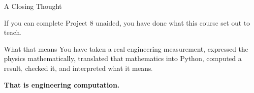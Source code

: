 \documentclass[9pt,aspectratio=169,xcolor=table]{beamer}
\begin{document}
\begin{frame}{A Closing Thought}
    \leavevmode
    \begin{center}
    \large
    If you can complete Project 8 unaided, you have done what this
    course set out to teach.
    \end{center}

    \vspace{4mm}
    \begin{block}{What that means}
        You have taken a real engineering measurement, expressed the
        physics mathematically, translated that mathematics into Python,
        computed a result, checked it, and interpreted what it means.
    \end{block}

    \vspace{4mm}
    \begin{center}
        \Large\color{primary}\textbf{That is engineering computation.}
    \end{center}
\end{frame}
\end{document}
